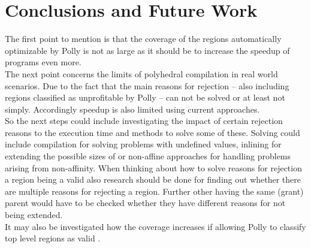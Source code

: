 \chapter{Conclusions and Future Work}
The first point to mention is that the coverage of the regions automatically optimizable by Polly is not as large as it should be to increase the speedup of programs even more.\\
The next point concerns the limits of polyhedral compilation in real world scenarios.
Due to the fact that the main reasons for rejection -- also including regions classified as unprofitable by Polly -- can not be solved or at least not simply.
Accordingly speedup is also limited using current approaches.\\
So the next steps could include investigating the impact of certain rejection reasons to the execution time and methods to solve some of these.
Solving could include \jit compilation for solving problems with undefined values, inlining for extending the possible sizes of \scops or non-affine approaches for handling problems arising from non-affinity.
When thinking about how to solve reasons for rejection a region being a valid \scop also research should be done for finding out whether there are multiple reasons for rejecting a region.
Further other \scops having the same (grant) parent would have to be checked whether they have different reasons for not being extended.\\
It may also be investigated how the coverage increases if allowing Polly to classify top level regions as valid \scops.\\
